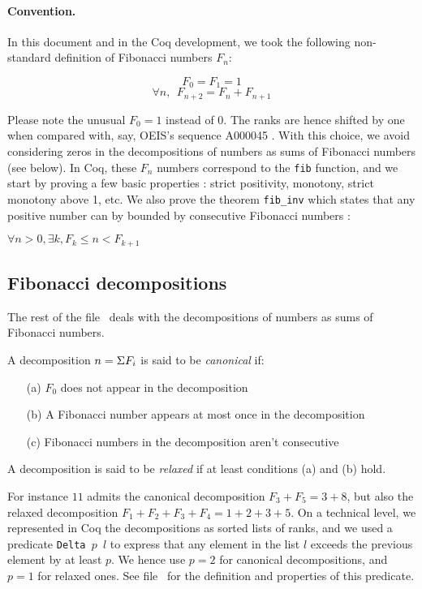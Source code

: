 \documentclass[a4paper,11pt]{article}
\begin{document}
\paragraph{Convention.} In this document and in the Coq development,
we took the following non-standard definition of Fibonacci numbers
$F_n$:

$$F_0 = F_1 = 1$$
$$\forall n,~~ F_{n+2} = F_{n}+F_{n+1}$$

Please note the unusual $F_0 = 1$ instead of $0$. The ranks are hence
shifted by one when compared with, say, OEIS's sequence A000045
\cite{OEIS-Fib}.
With this choice, we avoid considering zeros in the
decompositions of numbers as sums of Fibonacci numbers (see
below). In Coq, these $F_n$ numbers correspond to the {\tt fib}
function, and we start by proving a few basic properties :
strict positivity, monotony, strict monotony above 1, etc.
We also prove the theorem {\tt fib\_inv} which states 
that any positive number can by bounded by
consecutive Fibonacci numbers :

\begin{theorem}\label{fibinv}
$\forall n>0, \exists k, F_k \le n < F_{k+1}$
\end{theorem}

\subsection{Fibonacci decompositions} The rest of the file \
deals with the decompositions of numbers as sums of Fibonacci
numbers.
\begin{definition}
 A decomposition $n = \Sigma F_i$ is said to be \emph{canonical} if:
\begin{itemize}
\item[(a)] $F_0$ does not appear in the decomposition
\item[(b)] A Fibonacci number appears at most once in the decomposition
\item[(c)] Fibonacci numbers in the decomposition aren't consecutive
\end{itemize}
A decomposition is said to be \emph{relaxed} if at least conditions
(a) and (b) hold. 
\end{definition}
For instance $11$ admits the canonical decomposition
$F_3+F_5 = 3 + 8$, but also the relaxed decomposition $F_1+F_2+F_3+F_4
= 1 + 2 + 3 + 5$.
On a technical level, we represented in Coq the decompositions
as sorted lists of ranks, and we used a predicate {\tt Delta $p$ $l$}
to express that any element in the list $l$ exceeds the previous
element by at least $p$. We hence use $p=2$ for canonical
decompositions, and $p=1$ for relaxed ones. See file
\ for the definition and properties of this
predicate.
\end{document}
